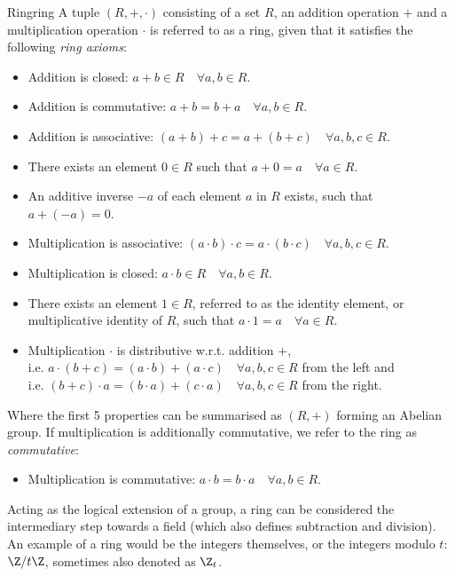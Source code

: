 \begin{definition}{Ring}{ring}
  A tuple $(R, +, \cdot)$ consisting of a set $R$, an addition operation $+$ and a multiplication operation $\cdot$
  is referred to as a ring, given that it satisfies the following \textit{ring axioms}:
  \begin{itemize}
    \item Addition is closed: $a + b \in R \quad\forall a, b \in R$.
    \item Addition is commutative: $a + b = b + a \quad\forall a, b \in R$.
    \item Addition is associative: $(a + b) + c = a + (b + c) \quad\forall a, b, c \in R$.
    \item There exists an element $0 \in R$ such that $a + 0 = a \quad\forall a \in R$.
    \item An additive inverse $-a$ of each element $a$ in $R$ exists, such that $a + (-a) = 0$.
    \item Multiplication is associative: $(a \cdot b) \cdot c = a \cdot (b \cdot c) \quad\forall a, b, c \in R$.
    \item Multiplication is closed: $a \cdot b \in R \quad\forall a, b \in R$.
    \item There exists an element $1 \in R$, referred to as the identity element, or multiplicative identity of $R$,
          such that $a \cdot 1 = a \quad\forall a \in R$.
    \item Multiplication $\cdot$ is distributive w.r.t. addition $+$, \\
          i.e. $a \cdot (b+c) = (a \cdot b) + (a \cdot c) \quad\forall a, b, c \in R$ from the left and \\
          i.e. $(b+c) \cdot a = (b \cdot a) + (c \cdot a) \quad\forall a, b, c \in R$ from the right.
  \end{itemize}
  Where the first 5 properties can be summarised as $(R, +)$ forming an Abelian group.
  If multiplication is additionally commutative, we refer to the ring as \textit{commutative}:
  \begin{itemize}
    \item Multiplication is commutative: $a \cdot b = b \cdot a \quad\forall a, b \in R$.
  \end{itemize}
\end{definition}
Acting as the logical extension of a group, a ring can be considered the intermediary step towards a field (which also defines subtraction and division).
An example of a ring would be the integers themselves, or the integers modulo $t$: $\Z / t \Z$, sometimes also denoted as $\Z_t$.

